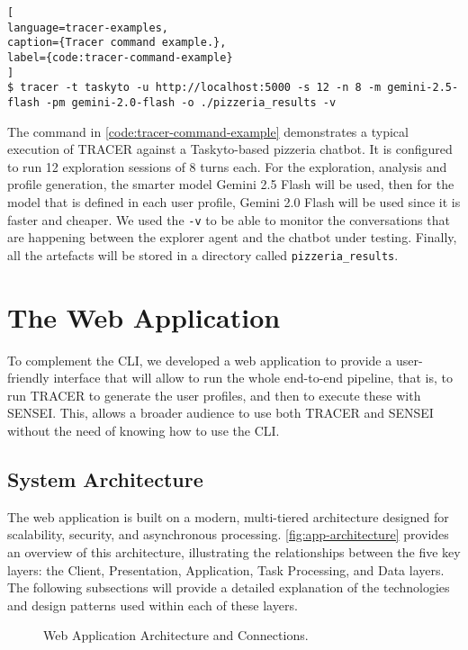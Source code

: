 \begin{lstlisting}[
language=tracer-examples,
caption={Tracer command example.},
label={code:tracer-command-example}
]
$ tracer -t taskyto -u http://localhost:5000 -s 12 -n 8 -m gemini-2.5-flash -pm gemini-2.0-flash -o ./pizzeria_results -v
\end{lstlisting}

The command in \autoref{code:tracer-command-example}
demonstrates a typical execution of \ac{TRACER} against a Taskyto-based pizzeria chatbot.
It is configured to run 12 exploration sessions of 8 turns each.
For the exploration, analysis and profile generation, the smarter model Gemini 2.5 Flash will be used,
then for the model that is defined in each user profile, Gemini 2.0 Flash will be used since it is faster and cheaper.
We used the \texttt{-v} to be able to monitor the conversations that are happening
between the explorer agent and the chatbot under testing.
Finally, all the artefacts will be stored in a directory called \texttt{pizzeria\_results}.

\section{The Web Application}

To complement the \ac{CLI},
we developed a web application
to provide a user-friendly interface that will allow to run the whole end-to-end pipeline,
that is, to run \ac{TRACER} to generate the user profiles,
and then to execute these with SENSEI.
This, allows a broader audience to use both \ac{TRACER} and SENSEI
without the need of knowing how to use the \ac{CLI}.

\subsection{System Architecture}

The web application is built on a modern,
multi-tiered architecture designed for scalability, security, and asynchronous processing.
\autoref{fig:app-architecture} provides an overview of this architecture,
illustrating the relationships between the five key layers:
the Client, Presentation, Application, Task Processing, and Data layers.
The following subsections will provide a detailed explanation
of the technologies and design patterns used within each of these layers.

\begin{figure}[!htbp]
    \centering
    
    \caption{Web Application Architecture and Connections.}
    \label{fig:app-architecture}
\end{figure}

